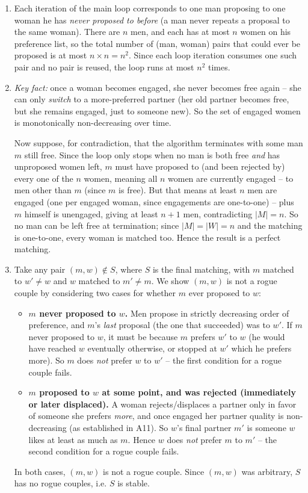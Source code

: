 \documentclass[11pt]{article}
\begin{document}
\begin{enumerate}[label=\textbf{A\arabic*.}, leftmargin=2.2em]
\item Each iteration of the main loop corresponds to one man proposing to one woman he
has \emph{never proposed to before} (a man never repeats a proposal to the same woman).
There are $n$ men, and each has at most $n$ women on his preference list, so the total
number of (man, woman) pairs that could ever be proposed is at most $n \times n = n^2$.
Since each loop iteration consumes one such pair and no pair is reused, the loop runs at
most $n^2$ times.

\item \emph{Key fact:} once a woman becomes engaged, she never becomes free again -- she
can only \emph{switch} to a more-preferred partner (her old partner becomes free, but she
remains engaged, just to someone new). So the set of engaged women is monotonically
non-decreasing over time.

Now suppose, for contradiction, that the algorithm terminates with some man $m$ still
free. Since the loop only stops when no man is both free \emph{and} has unproposed
women left, $m$ must have proposed to (and been rejected by) every one of the $n$ women,
meaning all $n$ women are currently engaged -- to men other than $m$ (since $m$ is free).
But that means at least $n$ men are engaged (one per engaged woman, since engagements are
one-to-one) -- plus $m$ himself is unengaged, giving at least $n+1$ men, contradicting
$|M| = n$. So no man can be left free at termination; since $|M|=|W|=n$ and the matching
is one-to-one, every woman is matched too. Hence the result is a perfect matching.

\item Take any pair $(m,w) \notin S$, where $S$ is the final matching, with $m$ matched to
$w' \ne w$ and $w$ matched to $m' \ne m$. We show $(m,w)$ is not a rogue couple by
considering two cases for whether $m$ ever proposed to $w$:
\begin{itemize}
    \item \textbf{$m$ never proposed to $w$.} Men propose in strictly decreasing order of
    preference, and $m$'s \emph{last} proposal (the one that succeeded) was to $w'$. If
    $m$ never proposed to $w$, it must be because $m$ prefers $w'$ to $w$ (he would have
    reached $w$ eventually otherwise, or stopped at $w'$ which he prefers more). So $m$
    does \emph{not} prefer $w$ to $w'$ -- the first condition for a rogue couple fails.
    \item \textbf{$m$ proposed to $w$ at some point, and was rejected (immediately or
    later displaced).} A woman rejects/displaces a partner only in favor of someone she
    prefers \emph{more}, and once engaged her partner quality is non-decreasing (as
    established in A11). So $w$'s final partner $m'$ is someone $w$ likes at least as
    much as $m$. Hence $w$ does \emph{not} prefer $m$ to $m'$ -- the second condition for
    a rogue couple fails.
\end{itemize}
In both cases, $(m,w)$ is not a rogue couple. Since $(m,w)$ was arbitrary, $S$ has no
rogue couples, i.e. $S$ is stable.


\end{enumerate}
\end{document}
